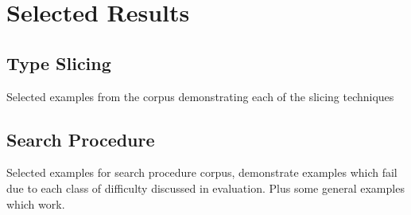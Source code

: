 \chapter{Selected Results}
\section{Type Slicing}
Selected examples from the corpus demonstrating each of the slicing techniques

\section{Search Procedure}
Selected examples for search procedure corpus, demonstrate examples which fail due to each class of difficulty discussed in evaluation. Plus some general examples which work.